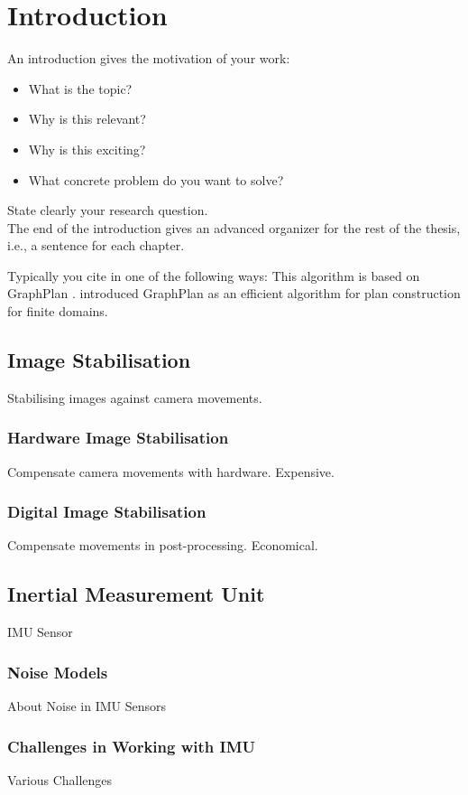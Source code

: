 \chapter{Introduction} \label{chapter_one}

An introduction gives the motivation of your work:
\begin{itemize}
\item What is the topic?
\item Why is this relevant?
\item Why is this exciting?
\item What concrete problem do you want to solve?
\end{itemize} 
State clearly your research question. \\
The end of the introduction gives an advanced organizer for the rest of the thesis, i.e., a sentence for each chapter.

Typically you cite in one of the following ways: This algorithm is based on {\sc GraphPlan} \citep{Blum97}. \citet{Blum97} introduced {\sc GraphPlan} as an efficient algorithm for plan construction for finite domains.


\section{Image Stabilisation}
Stabilising images against camera movements.

\subsection{Hardware Image Stabilisation}
Compensate camera movements with hardware. Expensive.

\subsection{Digital Image Stabilisation}
Compensate movements in post-processing. Economical.

\section{Inertial Measurement Unit}
IMU Sensor

\subsection{Noise Models}
About Noise in IMU Sensors

\subsection{Challenges in Working with IMU}
Various Challenges
